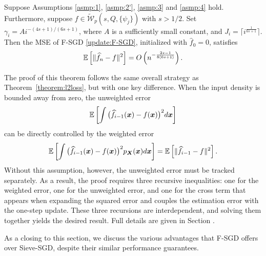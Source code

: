 \begin{theorem}\label{thm:polynomial}
    Suppose Assumptions \ref{asmp:1}, \ref{asmp:2'}, \ref{asmp:3} and \ref{asmp:4} hold. Furthermore, suppose $f \in \tilde{\mathcal{W}}_p(s,Q, \{\psi_j\})$ with $s > 1/2$. Set $\gamma_i = Ai^{-(4s+1)/(6s+1)}$, where $A$ is a sufficiently small constant, and $J_i = \lceil i^{\frac{1}{6s+1}} \rceil$. Then the MSE of F-SGD \eqref{update:F-SGD}, initialized with $\hat f_0 = 0$, satisfies
 \begin{align*}
        \mathbb{E} \left[ \| \widehat{f}_n - f\|^2 \right] = O\left(n^{-\frac{2s-1}{8(6s+1)}}\right).
\end{align*}
\end{theorem}

The proof of this theorem follows the same overall strategy as Theorem~\ref{theorem:l2loss}, 
but with one key difference. When the input density is bounded away from zero, the 
unweighted error
\[
\mathbb{E}\left[\int \big(\widehat f_{i-1}(\boldsymbol{x})-f(\boldsymbol{x})\big)^2 d\boldsymbol{x}\right]
\]
can be directly controlled by the weighted error
\[
\mathbb{E}\left[\int \big(\widehat f_{i-1}(\boldsymbol{x})-f(\boldsymbol{x})\big)^2 p_{\bm{X}}(\boldsymbol{x}) d\boldsymbol{x}\right] 
= \mathbb{E}\left[\|\widehat f_{i-1}-f\|^2\right].
\]
Without this assumption, however, the unweighted error must be tracked separately. 
As a result, the proof requires three recursive inequalities: one for the weighted error, 
one for the unweighted error, and one for the cross term that appears when expanding the 
squared error and couples the estimation error with the one-step update. 
These three recursions are interdependent, and solving them together yields the desired result. 
Full details are given in Section \label{appdx:proof}.

As a closing to this section, we discuss the various advantages that F-SGD offers over Sieve-SGD, despite their similar performance guarantees.


